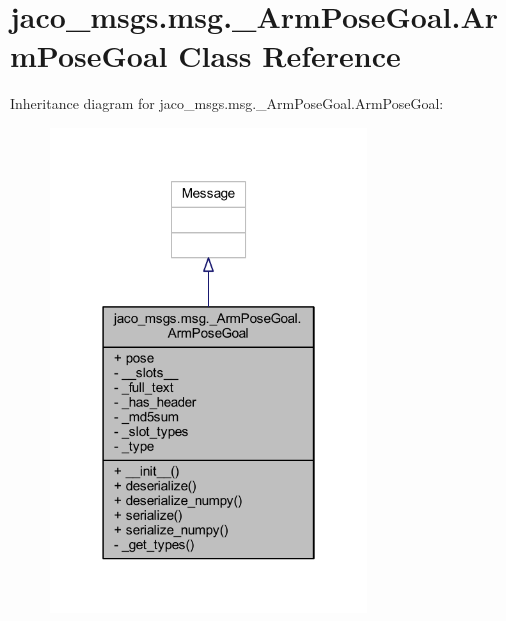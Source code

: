 \hypertarget{classjaco__msgs_1_1msg_1_1__ArmPoseGoal_1_1ArmPoseGoal}{}\section{jaco\+\_\+msgs.\+msg.\+\_\+\+Arm\+Pose\+Goal.\+Arm\+Pose\+Goal Class Reference}
\label{classjaco__msgs_1_1msg_1_1__ArmPoseGoal_1_1ArmPoseGoal}


Inheritance diagram for jaco\+\_\+msgs.\+msg.\+\_\+\+Arm\+Pose\+Goal.\+Arm\+Pose\+Goal\+:
\nopagebreak
\begin{figure}[H]
\begin{center}
\leavevmode
\includegraphics[width=238pt]{d7/de8/classjaco__msgs_1_1msg_1_1__ArmPoseGoal_1_1ArmPoseGoal__inherit__graph}
\end{center}
\end{figure}


